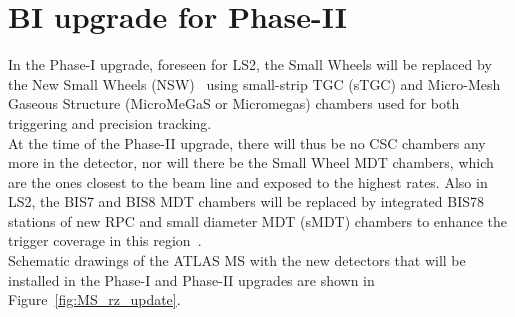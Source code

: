 \section {BI upgrade for Phase-II}
\label{BI_upg}
In the Phase-I upgrade, foreseen for LS2, the Small Wheels will be replaced by the New Small Wheels (NSW)~\cite{NSW} using small-strip TGC (sTGC) and Micro-Mesh Gaseous Structure
(MicroMeGaS or Micromegas) chambers used for both triggering and precision tracking.\\
At the time of the Phase-II upgrade, there will thus be no CSC chambers
any more in the detector, nor will there be the Small Wheel MDT chambers, which are the ones closest to the beam line and exposed to the highest rates. Also in LS2, the BIS7 and
BIS8 MDT chambers will be replaced by integrated BIS78 stations of new RPC and small diameter MDT (sMDT) chambers to enhance the trigger coverage in this region~\cite{BIS78}.\\
Schematic drawings of the ATLAS MS with the new detectors that will be installed in the Phase-I and Phase-II upgrades are shown in Figure~\ref{fig:MS_rz_update}.\\
